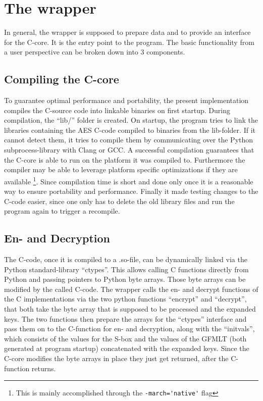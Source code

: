 \hypertarget{the-wrapper}{%
\section{The wrapper}\label{the-wrapper}}

In general, the wrapper is supposed to prepare data and to provide an
interface for the C-core. It is the entry point to the program. The
basic functionality from a user perspective can be broken down into 3
components.

\hypertarget{compiling-the-c-core}{%
\subsection{Compiling the C-core}\label{compiling-the-c-core}}

To guarantee optimal performance and portability, the present
implementation compiles the C-source code into linkable binaries on
first startup. During compilation, the \enquote{lib/} folder is created.
On startup, the program tries to link the libraries containing the AES
C-code compiled to binaries from the lib-folder. If it cannot detect
them, it tries to compile them by communicating over the Python
subprocess-library with Clang or GCC. A successful compilation
guarantees that the C-core is able to run on the platform it was
compiled to. Furthermore the compiler may be able to leverage platform
specific optimizations if they are available \footnote{This is mainly accomplished through the \lstinline{-march='native'} flag}. Since compilation time is
short and done only once it is a reasonable way to ensure portability
and performance. Finally it made testing changes to the C-code easier,
since one only has to delete the old library files and run the program
again to trigger a recompile.

\hypertarget{En--and-Decryption}{%
\subsection{En- and Decryption}\label{en--and-decryption}}

The C-code, once it is compiled to a .so-file, can be dynamically linked
via the Python standard-library \enquote{ctypes}. This allows calling C functions
directly from Python and passing pointers to Python byte arrays. Those
byte arrays can be modified by the called C-code. The wrapper
calls the en- and decrypt functions of the C implementations via the two
python functions ``encrypt'' and ``decrypt'', that both take the byte
array that is supposed to be processed and the expanded keys. The two
functions then prepare the arrays for the \enquote{ctypes} interface and pass them
on to the C-function for en- and decryption, along with the \enquote{initvals},
which consists of the values for the S-box and the values of the GFMLT
(both generated at program startup) concatenated with the expanded keys.
Since the C-core modifies the byte arrays in place they just get
returned, after the C-function returns.


